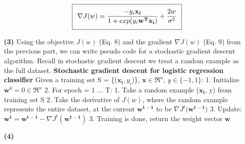 \documentclass[11pt]{article}
\renewcommand\part[1]{\vspace{.10in}\textbf{(#1)}}
\begin{document}
\begin{equation}
\setlength\fboxsep{0.25cm}
\setlength\fboxrule{0.4pt}
\boxed{\nabla J(w) = \frac{-y_i\mathbf{x_i}}{1 + exp(y_i\mathbf{w^Tx_i})} + \frac{2w}{\sigma^2}}
\end{equation}

\part{3} Using the objective $J(w)$ (Eq. 8) and the gradient $\nabla J(w)$ (Eq. 9) from the previous part, we can write pseudo code for a stochastic gradient descent algorithm. Recall in stochastic gradient descent we treat a random example as the full dataset.
\vspace{2mm} \break
{\Large \textbf{Stochastic gradient descent for logistic regression classifier}} \vspace{2mm} \break
{\large Given a training set S = \{($\mathbf{x_i}, y_i$)\}, $\mathbf{x} \in \Re^n$, $y \in \{-1, 1\}$:} \vspace{2mm} \break
{\large 1. \hspace{5mm} Initialize $\mathbf{w}^0 = 0 \in \Re^n$} \vspace{2mm} \break
{\large 2. \hspace{5mm} For epoch = 1 ... T:} \vspace{2mm} \break
{\large \hspace*{20mm} 1. Take a random example ($\mathbf{x_i}$, y) from training set S} \vspace{2mm} \break
{\large \hspace*{20mm} 2. Take the derivative of $J(w)$, where the random example represents the entire}
{\large \hspace*{25mm} dataset, at the current $\mathbf{w^{t-1}}$ to be $\nabla J^t(\mathbf{w^{t-1})}$} \vspace{2mm} \break
{\large \hspace*{20mm} 3. Update: $\mathbf{w^t} = \mathbf{w^{t-1}} - \nabla J^t(\mathbf{w^{t-1}})$} \vspace{2mm} \break
{\large 3. Training is done, return the weight vector $\mathbf{w}$}

\part{4}
\end{document}
